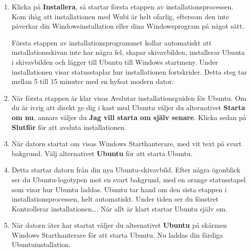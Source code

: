 \documentclass[a4paper,final]{memoir} %
\begin{document}
\begin{enumerate}
\begin{description}

\end{description}

\item Klicka på \textbf{Installera}, så startar första etappen av installationsprocessen. Kom ihåg att installationen med Wubi är helt ofarlig, eftersom den inte påverkar din Windowsinstallation eller dina Windowsprogram på något sätt. 

Första etappen av installationsprogrammet kollar automatiskt att installationsskivan inte har några fel, skapar skivavbilden, installerar Ubunta i skivavbilden och lägger till Ubuntu till Windows startmeny. Under installationen visar statusstaplar hur installationen fortskrider. Detta steg tar mellan 5 till 15 minuter med en hyfsat modern dator. 


\item När första etappen är klar visas Avslutar installationsguiden för Ubuntu. Om du är ivrig att direkt ge dig i kast med Ubuntu väljer du alternativet \textbf{Starta om nu}, annars väljer du \textbf{Jag vill starta om själv senare}. Klicka sedan på \textbf{Slutför} för att avsluta installationen.


\item När datorn startat om visas Windows Starthanterare, med vit text på svart bakgrund. Välj alternativet \textbf{Ubuntu} för att starta Ubuntu. 

\item Detta startar datorn från din nya Ubuntu-skivavbild. Efter några ögonblick ser du Ubuntu-logotypen mot en svart bakgrund, med en orange statusstapel som visar hur Ubuntu laddas. Ubuntu tar hand om den sista etappen i installationsprocessen, helt automatiskt. Under tiden ser du fönstret Kontrollerar installationen\ldots{}. När allt är klart startar Ubuntu själv om.

\item När datorn åter har startat väljer du alternativet \textbf{Ubuntu} på skärmen Windows Starthanterare för att starta Ubuntu. Nu laddas din färdiga Ubuntuinstallation.

\end{enumerate}
\end{document}

